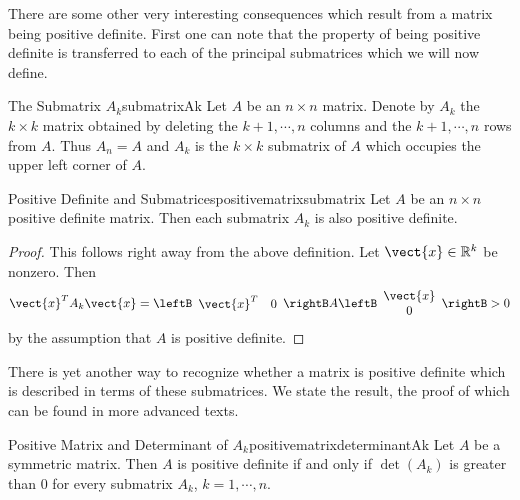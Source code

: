 There are some other very interesting consequences which result from a
matrix being positive definite. First one can note that the property of
being positive definite is transferred to each of the principal submatrices which we will now define.

\begin{definition}{The Submatrix $A_k$}{submatrixAk}
Let $A$ be an $n\times n$ matrix. Denote by $A_{k}$ the $k\times k$ matrix
obtained by deleting the $k+1,\cdots ,n$ columns and the $k+1,\cdots ,n$
rows from $A.$ Thus $A_{n}=A$ and $A_{k}$ is the $k\times k$ submatrix of $A$
which occupies the upper left corner of $A.$
\end{definition}

\begin{lemma}{Positive Definite and Submatrices}{positivematrixsubmatrix}
Let $A$ be an $n\times n$ positive definite matrix.  Then each submatrix $A_{k}$ is also positive definite.
\end{lemma}

\begin{proof}
This follows right away from the above definition. Let $\vect{x}\in \mathbb{R}^{k}$ be nonzero. Then 
\begin{equation*}
\vect{x}^{T}A_{k}\vect{x}=\leftB 
\begin{array}{cc}
\vect{x}^{T} & 0
\end{array}
\rightB A\leftB 
\begin{array}{c}
\vect{x} \\ 
0
\end{array}
\rightB >  0
\end{equation*}
by the assumption that $A$ is positive definite.
\end{proof}

There is yet another way to recognize whether a matrix is positive definite
which is described in terms of these submatrices. We state the result,  the proof
of which can be found in more advanced texts.

\begin{theorem}{Positive Matrix and Determinant of $A_k$}{positivematrixdeterminantAk}   
Let $A$ be a symmetric matrix. Then $A$ is positive definite if
and only if $\det \left( A_{k}\right)$ is greater than $0$ for every submatrix $A_{k}$,  $k=1,\cdots ,n$. 
\end{theorem}

